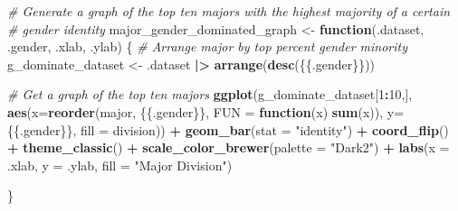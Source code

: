 \documentclass[
  twocolumn]{article}
\newenvironment{Shaded}{\begin{snugshade}}{\end{snugshade}}
\newcommand{\AttributeTok}[1]{\textcolor[rgb]{0.13,0.29,0.53}{#1}}
\newcommand{\CommentTok}[1]{\textcolor[rgb]{0.56,0.35,0.01}{\textit{#1}}}
\newcommand{\ControlFlowTok}[1]{\textcolor[rgb]{0.13,0.29,0.53}{\textbf{#1}}}
\newcommand{\DecValTok}[1]{\textcolor[rgb]{0.00,0.00,0.81}{#1}}
\newcommand{\FunctionTok}[1]{\textcolor[rgb]{0.13,0.29,0.53}{\textbf{#1}}}
\newcommand{\NormalTok}[1]{#1}
\newcommand{\OtherTok}[1]{\textcolor[rgb]{0.56,0.35,0.01}{#1}}
\newcommand{\SpecialCharTok}[1]{\textcolor[rgb]{0.81,0.36,0.00}{\textbf{#1}}}
\newcommand{\StringTok}[1]{\textcolor[rgb]{0.31,0.60,0.02}{#1}}
\begin{document}
\begin{Shaded}
\begin{Highlighting}[]
\CommentTok{\# Generate a graph of the top ten majors with the highest majority of a certain}
\CommentTok{\# gender identity}
\NormalTok{major\_gender\_dominated\_graph }\OtherTok{\textless{}{-}} \ControlFlowTok{function}\NormalTok{(.dataset, .gender, .xlab, .ylab) \{}
  \CommentTok{\# Arrange major by top percent gender minority}
\NormalTok{  g\_dominate\_dataset }\OtherTok{\textless{}{-}}\NormalTok{ .dataset }\SpecialCharTok{|\textgreater{}}
    \FunctionTok{arrange}\NormalTok{(}\FunctionTok{desc}\NormalTok{(\{\{.gender\}\}))}
  
  \CommentTok{\# Get a graph of the top ten majors}
  \FunctionTok{ggplot}\NormalTok{(g\_dominate\_dataset[}\DecValTok{1}\SpecialCharTok{:}\DecValTok{10}\NormalTok{,],}
         \FunctionTok{aes}\NormalTok{(}\AttributeTok{x=}\FunctionTok{reorder}\NormalTok{(major, \{\{.gender\}\}, }\AttributeTok{FUN =} \ControlFlowTok{function}\NormalTok{(x) }\FunctionTok{sum}\NormalTok{(x)),}
             \AttributeTok{y=}\NormalTok{\{\{.gender\}\},}
             \AttributeTok{fill =}\NormalTok{ division)) }\SpecialCharTok{+}
    \FunctionTok{geom\_bar}\NormalTok{(}\AttributeTok{stat =} \StringTok{"identity"}\NormalTok{) }\SpecialCharTok{+}
    \FunctionTok{coord\_flip}\NormalTok{() }\SpecialCharTok{+}
    \FunctionTok{theme\_classic}\NormalTok{() }\SpecialCharTok{+}
    \FunctionTok{scale\_color\_brewer}\NormalTok{(}\AttributeTok{palette =} \StringTok{"Dark2"}\NormalTok{) }\SpecialCharTok{+}
    \FunctionTok{labs}\NormalTok{(}\AttributeTok{x =}\NormalTok{ .xlab,}
         \AttributeTok{y =}\NormalTok{ .ylab,}
         \AttributeTok{fill =} \StringTok{"Major Division"}\NormalTok{)}

\NormalTok{\}}
\end{Highlighting}
\end{Shaded}
\end{document}
